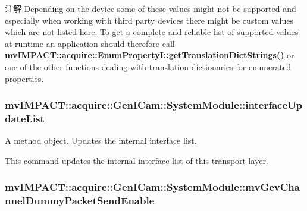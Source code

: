 \begin{DoxyNote}{注解}
Depending on the device some of these values might not be supported and especially when working with third party devices there might be custom values which are not listed here. To get a complete and reliable list of supported values at runtime an application should therefore call {\bfseries \hyperlink{classmv_i_m_p_a_c_t_1_1acquire_1_1_enum_property_i_a0ba6ccbf5ee69784d5d0b537924d26b6}{mv\+I\+M\+P\+A\+C\+T\+::acquire\+::\+Enum\+Property\+I\+::get\+Translation\+Dict\+Strings()}} or one of the other functions dealing with translation dictionaries for enumerated properties. 
\end{DoxyNote}
\hypertarget{classmv_i_m_p_a_c_t_1_1acquire_1_1_gen_i_cam_1_1_system_module_a9019b47e1561a33b050eae66a7a8372e}{
\subsubsection[{interface\+Update\+List}]{ mv\+I\+M\+P\+A\+C\+T\+::acquire\+::\+Gen\+I\+Cam\+::\+System\+Module\+::interface\+Update\+List}}\label{classmv_i_m_p_a_c_t_1_1acquire_1_1_gen_i_cam_1_1_system_module_a9019b47e1561a33b050eae66a7a8372e}


A method object. Updates the internal interface list. 

This command updates the internal interface list of this transport layer. \hypertarget{classmv_i_m_p_a_c_t_1_1acquire_1_1_gen_i_cam_1_1_system_module_a9881c83f6912bea00767ccbee5bc3385}{
\subsubsection[{mv\+Gev\+Channel\+Dummy\+Packet\+Send\+Enable}]{ mv\+I\+M\+P\+A\+C\+T\+::acquire\+::\+Gen\+I\+Cam\+::\+System\+Module\+::mv\+Gev\+Channel\+Dummy\+Packet\+Send\+Enable}}\label{classmv_i_m_p_a_c_t_1_1acquire_1_1_gen_i_cam_1_1_system_module_a9881c83f6912bea00767ccbee5bc3385}


